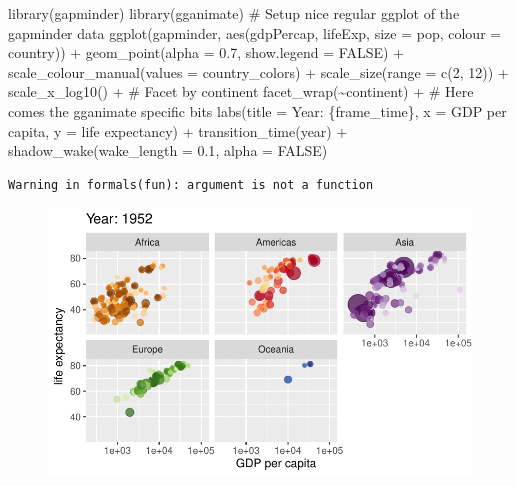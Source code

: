 \documentclass[
  letterpaper,
  DIV=11,
  numbers=noendperiod]{scrartcl}
\newenvironment{Shaded}{\begin{snugshade}}{\end{snugshade}}
\newcommand{\AttributeTok}[1]{\textcolor[rgb]{0.40,0.45,0.13}{#1}}
\newcommand{\CommentTok}[1]{\textcolor[rgb]{0.37,0.37,0.37}{#1}}
\newcommand{\ConstantTok}[1]{\textcolor[rgb]{0.56,0.35,0.01}{#1}}
\newcommand{\DecValTok}[1]{\textcolor[rgb]{0.68,0.00,0.00}{#1}}
\newcommand{\FloatTok}[1]{\textcolor[rgb]{0.68,0.00,0.00}{#1}}
\newcommand{\FunctionTok}[1]{\textcolor[rgb]{0.28,0.35,0.67}{#1}}
\newcommand{\NormalTok}[1]{\textcolor[rgb]{0.00,0.23,0.31}{#1}}
\newcommand{\SpecialCharTok}[1]{\textcolor[rgb]{0.37,0.37,0.37}{#1}}
\newcommand{\StringTok}[1]{\textcolor[rgb]{0.13,0.47,0.30}{#1}}
\begin{document}
\begin{Shaded}
\begin{Highlighting}[]
\FunctionTok{library}\NormalTok{(gapminder)}
\FunctionTok{library}\NormalTok{(gganimate)}
\CommentTok{\# Setup nice regular ggplot of the gapminder data}
\FunctionTok{ggplot}\NormalTok{(gapminder, }\FunctionTok{aes}\NormalTok{(gdpPercap, lifeExp, }\AttributeTok{size =}\NormalTok{ pop, }\AttributeTok{colour =}\NormalTok{ country)) }\SpecialCharTok{+}
  \FunctionTok{geom\_point}\NormalTok{(}\AttributeTok{alpha =} \FloatTok{0.7}\NormalTok{, }\AttributeTok{show.legend =} \ConstantTok{FALSE}\NormalTok{) }\SpecialCharTok{+}
  \FunctionTok{scale\_colour\_manual}\NormalTok{(}\AttributeTok{values =}\NormalTok{ country\_colors) }\SpecialCharTok{+}
  \FunctionTok{scale\_size}\NormalTok{(}\AttributeTok{range =} \FunctionTok{c}\NormalTok{(}\DecValTok{2}\NormalTok{, }\DecValTok{12}\NormalTok{)) }\SpecialCharTok{+}
  \FunctionTok{scale\_x\_log10}\NormalTok{() }\SpecialCharTok{+}
  \CommentTok{\# Facet by continent}
  \FunctionTok{facet\_wrap}\NormalTok{(}\SpecialCharTok{\textasciitilde{}}\NormalTok{continent) }\SpecialCharTok{+}
  \CommentTok{\# Here comes the gganimate specific bits}
  \FunctionTok{labs}\NormalTok{(}\AttributeTok{title =} \StringTok{\textquotesingle{}Year: \{frame\_time\}\textquotesingle{}}\NormalTok{, }\AttributeTok{x =} \StringTok{\textquotesingle{}GDP per capita\textquotesingle{}}\NormalTok{, }\AttributeTok{y =} \StringTok{\textquotesingle{}life expectancy\textquotesingle{}}\NormalTok{) }\SpecialCharTok{+}
  \FunctionTok{transition\_time}\NormalTok{(year) }\SpecialCharTok{+}
  \FunctionTok{shadow\_wake}\NormalTok{(}\AttributeTok{wake\_length =} \FloatTok{0.1}\NormalTok{, }\AttributeTok{alpha =} \ConstantTok{FALSE}\NormalTok{)}
\end{Highlighting}
\end{Shaded}

\begin{verbatim}
Warning in formals(fun): argument is not a function
\end{verbatim}

\begin{figure}[H]

{\centering \includegraphics{class05_files/figure-pdf/unnamed-chunk-24-1.pdf}

}

\end{figure}
\end{document}
